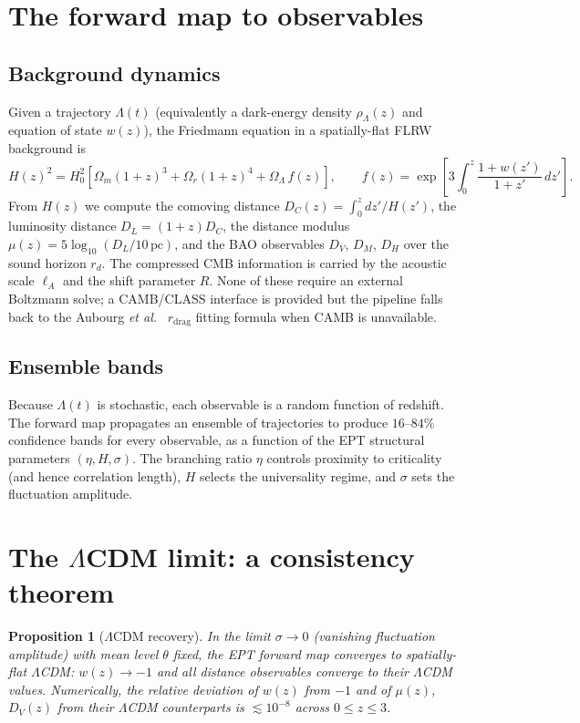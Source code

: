 \documentclass[11pt,a4paper]{article}
\newtheorem{proposition}[theorem]{Proposition}
\begin{document}
\section{The forward map to observables}

\subsection{Background dynamics}

Given a trajectory $\Lambda(t)$ (equivalently a dark-energy density $\rho_\Lambda(z)$ and equation of state $w(z)$), the Friedmann equation in a spatially-flat FLRW background is
\begin{equation}
H(z)^2 = H_0^2\left[\Omega_m(1+z)^3 + \Omega_r(1+z)^4 + \Omega_\Lambda\, f(z)\right],\qquad
f(z) = \exp\!\left[3\!\int_0^z \frac{1+w(z')}{1+z'}\,dz'\right].
\end{equation}
From $H(z)$ we compute the comoving distance $D_C(z)=\int_0^z dz'/H(z')$, the luminosity distance $D_L=(1+z)D_C$, the distance modulus $\mu(z)=5\log_{10}(D_L/10\,\mathrm{pc})$, and the BAO observables $D_V$, $D_M$, $D_H$ over the sound horizon $r_d$. The compressed CMB information is carried by the acoustic scale $\ell_A$ and the shift parameter $R$. None of these require an external Boltzmann solve; a CAMB/CLASS interface is provided but the pipeline falls back to the Aubourg \emph{et al.}\ \cite{Aubourg2015} $r_{\mathrm{drag}}$ fitting formula when CAMB is unavailable.

\subsection{Ensemble bands}

Because $\Lambda(t)$ is stochastic, each observable is a random function of redshift. The forward map propagates an ensemble of trajectories to produce $16$--$84\%$ confidence bands for every observable, as a function of the EPT structural parameters $(\eta, H, \sigma)$. The branching ratio $\eta$ controls proximity to criticality (and hence correlation length), $H$ selects the universality regime, and $\sigma$ sets the fluctuation amplitude.

\section{The $\Lambda$CDM limit: a consistency theorem}

\begin{proposition}[$\Lambda$CDM recovery]
\label{prop:lcdm}
In the limit $\sigma\to 0$ (vanishing fluctuation amplitude) with mean level $\theta$ fixed, the EPT forward map converges to spatially-flat $\Lambda$CDM: $w(z)\to -1$ and all distance observables converge to their $\Lambda$CDM values. Numerically, the relative deviation of $w(z)$ from $-1$ and of $\mu(z)$, $D_V(z)$ from their $\Lambda$CDM counterparts is $\lesssim 10^{-8}$ across $0\le z\le 3$.
\end{proposition}
\end{document}
